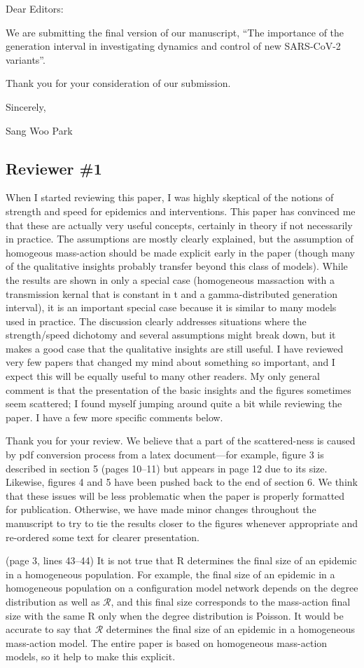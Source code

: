 \documentclass[12pt]{article}
\newcommand{\RR}{\ensuremath{{\mathcal R}}\xspace}
\newcommand{\rev}{\subsection*}
\newcommand{\revtext}{\textsf}
\begin{document}
\noindent Dear Editors:

We are submitting the final version of our manuscript, “The importance of the generation interval in investigating dynamics and control of new SARS-CoV-2 variants”.

Thank you for your consideration of our submission.

Sincerely,

Sang Woo Park

\rev{Reviewer \#1}

\revtext{When I started reviewing this paper, I was highly skeptical of the notions of strength and speed for epidemics and interventions. This paper has convinced me that these are actually very useful concepts, certainly in theory if not necessarily in practice. The assumptions are mostly clearly explained, but the assumption of homogeous mass-action should be made explicit early in the paper (though many of the qualitative insights probably transfer beyond this class of models). While the results are shown in only a special case (homogeneous massaction with a transmission kernal that is constant in t and a gamma-distributed generation interval), it is an important special case because it is similar to many models used in practice. The discussion clearly addresses situations where the strength/speed dichotomy and several assumptions might break down, but it makes a good case that the qualitative insights are still useful. I have reviewed very few papers that changed my mind about something so important, and I expect this will be equally useful to many other readers. My only general comment is that the presentation of the basic insights and the figures sometimes seem scattered; I found myself jumping around quite a bit while reviewing the paper. I have a few more specific comments below.}

Thank you for your review. We believe that a part of the scattered-ness is caused by pdf conversion process from a latex document---for example, figure 3 is described in section 5 (pages 10--11) but appears in page 12 due to its size. Likewise, figures 4 and 5 have been pushed back to the end of section 6. We think that these issues will be less problematic when the paper is properly formatted for publication. Otherwise, we have made minor changes throughout the manuscript to try to tie the results closer to the figures whenever appropriate and re-ordered some text for clearer presentation. 

\revtext{(page 3, lines 43–44) It is not true that R determines the final size of an epidemic in a homogeneous population. For example, the final size of an epidemic in a homogeneous population on a configuration model network depends on the degree distribution as well as $\RR$, and this final size corresponds to the mass-action final size with the same R only when the degree distribution is Poisson. It would be accurate to say that $\RR$ determines the final size of an epidemic in a homogeneous mass-action model. The entire paper is based on homogeneous mass-action models, so it help to make this explicit.}
\end{document}
